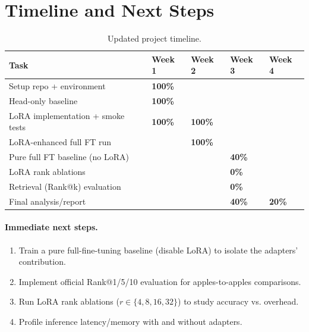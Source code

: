 \documentclass[11pt]{article}
\begin{document}
\section{Timeline and Next Steps}

\begin{table}[H]
\small
\centering
\renewcommand\arraystretch{1.25}
\setlength{\tabcolsep}{6pt}
\begin{tabular}{|>{\centering\arraybackslash}m{3.6cm}|>{\centering\arraybackslash}m{2cm}|>{\centering\arraybackslash}m{2cm}|>{\centering\arraybackslash}m{2cm}|>{\centering\arraybackslash}m{2cm}|}
\hline
\rowcolor{gray!20}\textbf{Task} & \textbf{Week 1} & \textbf{Week 2} & \textbf{Week 3} & \textbf{Week 4} \\
\hline
Setup repo + environment & \cellcolor{green!25}\textbf{100\%} & & & \\
\hline
Head-only baseline & \cellcolor{green!25}\textbf{100\%} & & & \\
\hline
LoRA implementation + smoke tests & \cellcolor{green!25}\textbf{100\%} & \cellcolor{green!25}\textbf{100\%} & & \\
\hline
LoRA-enhanced full FT run & & \cellcolor{green!25}\textbf{100\%} & & \\
\hline
Pure full FT baseline (no LoRA) & & & \cellcolor{yellow!35}\textbf{40\%} & \\
\hline
LoRA rank ablations & & & \cellcolor{orange!35}\textbf{0\%} & \\
\hline
Retrieval (Rank@k) evaluation & & & \cellcolor{orange!35}\textbf{0\%} & \\
\hline
Final analysis/report & & & \cellcolor{yellow!35}\textbf{40\%} & \cellcolor{red!20}\textbf{20\%} \\
\hline
\end{tabular}
\caption{Updated project timeline.}
\label{tab:timeline}
\end{table}

\paragraph{Immediate next steps.}
\begin{enumerate}
    \item Train a pure full-fine-tuning baseline (disable LoRA) to isolate the adapters' contribution.
    \item Implement official Rank@1/5/10 evaluation for apples-to-apples comparisons.
    \item Run LoRA rank ablations ($r \in \{4, 8, 16, 32\}$) to study accuracy vs. overhead.
    \item Profile inference latency/memory with and without adapters.
\end{enumerate}
\end{document}
